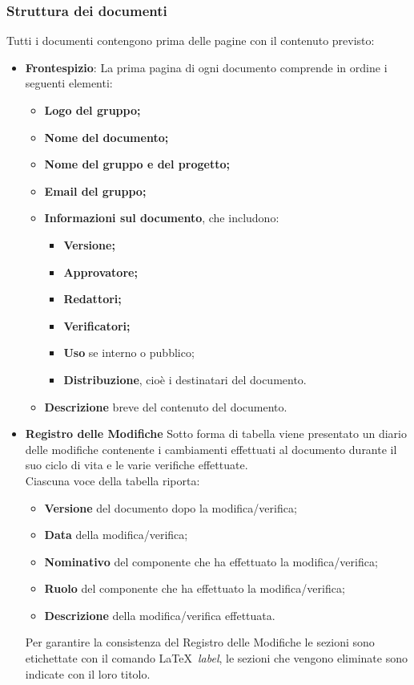 \subsubsection{Struttura dei documenti}\label{StrutturaDocumenti}
Tutti i documenti contengono prima delle pagine con il contenuto previsto:
\begin{itemize}
\item \textbf{Frontespizio}:
La prima pagina di ogni documento comprende in ordine i seguenti elementi:
\begin{itemize}
	\item \textbf{Logo del gruppo;}
	\item \textbf{Nome del documento;}
	\item \textbf{Nome del gruppo e del progetto;}
	\item \textbf{Email del gruppo;}
	\item \textbf{Informazioni sul documento}, che includono:
		\begin{itemize}
			\item \textbf{Versione;}
			\item \textbf{Approvatore;}
			\item \textbf{Redattori;}
			\item \textbf{Verificatori;}
			\item \textbf{Uso} se interno o pubblico;
			\item \textbf{Distribuzione}, cioè i destinatari del documento.
		\end{itemize}
	\item \textbf{Descrizione} breve del contenuto del documento.
\end{itemize}

\item\textbf{Registro delle Modifiche}
Sotto forma di tabella viene presentato un diario delle modifiche contenente i cambiamenti effettuati al documento durante il suo ciclo di vita e le varie verifiche effettuate.\\
Ciascuna voce della tabella riporta:
\begin{itemize}
	\item \textbf{Versione} del documento dopo la modifica/verifica;
	\item \textbf{Data} della modifica/verifica;
	\item \textbf{Nominativo} del componente che ha effettuato la modifica/verifica;
	\item \textbf{Ruolo} del componente che ha effettuato la modifica/verifica;
	\item \textbf{Descrizione} della modifica/verifica effettuata.
\end{itemize}
Per garantire la consistenza del Registro delle Modifiche le sezioni sono etichettate con il comando \LaTeX\ \textit{label}, le sezioni che vengono eliminate sono indicate con il loro titolo.


\end{itemize}
